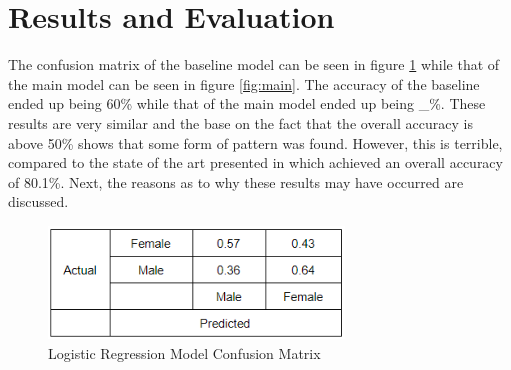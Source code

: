 \section{Results and Evaluation}
The confusion matrix of the baseline model can be seen in figure \ref{fig:baseline} while that of the main model can be seen in figure \ref{fig:main}. The accuracy of the baseline ended up being 60\% while that of the main model ended up being _\%. These results are very similar and the base on the fact that the overall accuracy is above 50\% shows that some form of pattern was found. However, this is terrible, compared to the state of the art presented in \cite{2} which achieved an overall accuracy of 80.1\%. Next, the reasons as to why these results may have occurred are discussed.

\begin{figure} \label{fig:baseline}
	\centering
	\includegraphics[width=0.7\textwidth]{Images/LR-CM.png}
	\caption{Logistic Regression Model Confusion Matrix}
\end{figure}